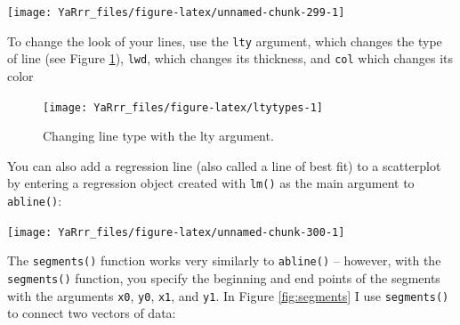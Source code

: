 \documentclass[]{book}
\newenvironment{Shaded}{\begin{snugshade}}{\end{snugshade}}
\newcommand{\KeywordTok}[1]{\textcolor[rgb]{0.13,0.29,0.53}{\textbf{#1}}}
\newcommand{\DataTypeTok}[1]{\textcolor[rgb]{0.13,0.29,0.53}{#1}}
\newcommand{\DecValTok}[1]{\textcolor[rgb]{0.00,0.00,0.81}{#1}}
\newcommand{\StringTok}[1]{\textcolor[rgb]{0.31,0.60,0.02}{#1}}
\newcommand{\CommentTok}[1]{\textcolor[rgb]{0.56,0.35,0.01}{\textit{#1}}}
\newcommand{\OperatorTok}[1]{\textcolor[rgb]{0.81,0.36,0.00}{\textbf{#1}}}
\newcommand{\NormalTok}[1]{#1}
\theoremstyle{definition}
\theoremstyle{definition}
\theoremstyle{remark}
\begin{document}
\begin{center}\texttt{[image: YaRrr\_files/figure-latex/unnamed-chunk-299-1]} \end{center}

To change the look of your lines, use the \texttt{lty} argument, which
changes the type of line (see Figure \ref{fig:ltytypes}), \texttt{lwd},
which changes its thickness, and \texttt{col} which changes its color

\begin{figure}

{\centering \texttt{[image: YaRrr\_files/figure-latex/ltytypes-1]} 

}

\caption{Changing line type with the lty argument.}\label{fig:ltytypes}
\end{figure}

You can also add a regression line (also called a line of best fit) to a
scatterplot by entering a regression object created with \texttt{lm()}
as the main argument to \texttt{abline()}:

\begin{Shaded}
\end{Shaded}

\begin{center}\texttt{[image: YaRrr\_files/figure-latex/unnamed-chunk-300-1]} \end{center}

The \texttt{segments()} function works very similarly to
\texttt{abline()} -- however, with the \texttt{segments()} function, you
specify the beginning and end points of the segments with the arguments
\texttt{x0}, \texttt{y0}, \texttt{x1}, and \texttt{y1}. In Figure
\ref{fig:segments} I use \texttt{segments()} to connect two vectors of
data:
\end{document}
